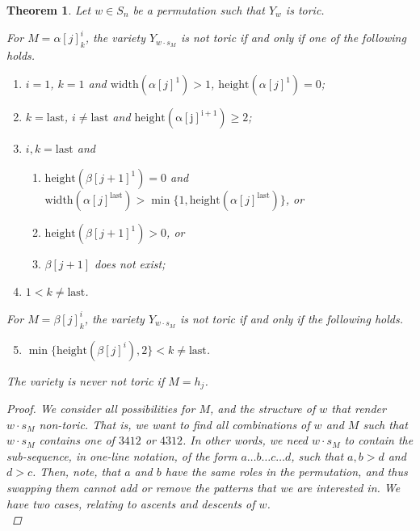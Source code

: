 \documentclass[11pt]{amsart}
\newtheorem{theorem}{Theorem}[section]
\theoremstyle{definition}
\theoremstyle{definition}
\theoremstyle{definition}
\theoremstyle{definition}
\begin{document}
\begin{theorem}\label{thm: all toric mS}
     Let $w\in S_n$ be a permutation such that $Y_w$ is toric. 

     For $M = \alpha[j]^i_k$, the variety ${Y_{w\cdot s_M}}$ is not toric if and only if one of the following holds.

     \begin{enumerate}
         \item $i=1$, $k=1$ and $ \mathrm{width}(\alpha[j]^1) >1$, $\mathrm{height}(\alpha[j]^\mathrm{1}) =0$;
         \item 
         $k = \mathrm{last}$, $i \neq \mathrm{last}$ and $\mathrm{height}(\mathrm{\alpha[j]^{i+1}})\geq2$;
         \item $i,k = \mathrm{last}$ and 
         \begin{enumerate}
            \item $\mathrm{height}(\beta[j+1]^1)=0$ and $\mathrm{width}(\alpha[j]^{\mathrm{last}}) > \min \{ 1, \mathrm{height}(\alpha[j]^{\mathrm{last}}) \}$, or
            \item $\mathrm{height}(\beta[j+1]^1)>0$, or
            \item $\beta[j+1]$ does not exist;
         \end{enumerate}
         \item $1 <k \neq \mathrm{last}$.
     \end{enumerate}

     For $M = \beta[j]^i_k$, the variety ${Y_{w\cdot s_M}}$ is not toric if and only if the following holds.

     \begin{enumerate}
         \setcounter{enumi}{4}
         
         \item $\min \{ \mathrm{height}(\beta[j]^i), 2 \} <k \neq \mathrm{last}$.
         
     \end{enumerate}

     The variety is never not toric if $M = h_j$.
     

\begin{proof}
    
    We consider all possibilities for $M$, and the structure of $w$ that render $w\cdot s_M$ non-toric. That is, we want to find all combinations of $w$ and $M$ such that $w\cdot s_M$ contains one of $3412$ or $4312$. In other words, we need $w\cdot s_M$ to contain the sub-sequence, in one-line notation, of the form $a\ldots b\ldots c \ldots d$, such that $a,b>d$ and $d>c$. Then, note, that $a$ and $b$ have the same roles in the permutation, and thus swapping them cannot add or remove the patterns that we are interested in.
    We have two cases, relating to ascents and descents of $w$.\\


\end{proof}
\end{theorem}
\end{document}
